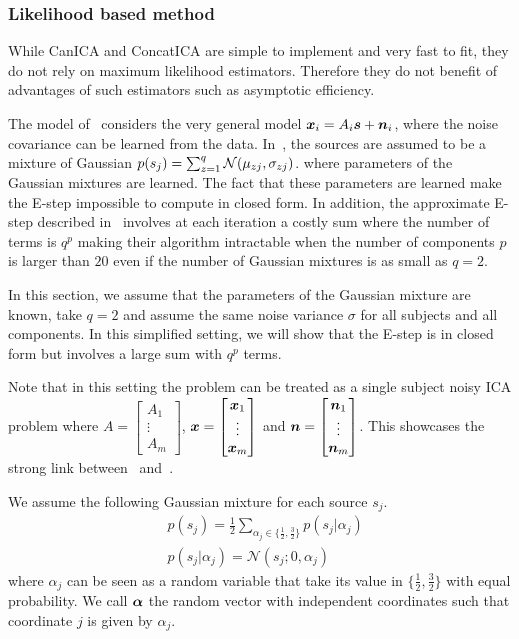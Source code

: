 \subsubsection{Likelihood based method}
\label{sec:guo}
While CanICA and ConcatICA are simple to implement and very fast to fit, they do
not rely on maximum likelihood estimators. Therefore they do not benefit of
advantages of such estimators such as asymptotic efficiency.

The model of~\cite{guo2008unified} considers the very general model $\boldsymbol{x}_i = A_i\boldsymbol{s} + \boldsymbol{n}_i$, where the noise covariance can be learned from the data. 
In~\cite{guo2008unified}, the sources are assumed to be a mixture of Gaussian
$p(s_j) = \sum_{z=1}^q \mathcal{N}(\mu_{zj}, \sigma_{zj})$.
where parameters of the Gaussian mixtures are learned. The fact that these
parameters are learned make the E-step impossible to compute in closed form. In
addition, the
approximate E-step described in~\cite{guo2008unified} involves at each iteration
a costly sum where the number of terms is $q^p$ making their algorithm
intractable when the number of components $p$ is larger than $20$ even if the
number of Gaussian mixtures is as small as $q=2$. 

In this section, we assume that the parameters of the Gaussian mixture are
known, take $q=2$ and assume the same noise variance $\sigma$ for all subjects and all
components. In this
simplified setting, we will show that the E-step is in closed form but involves
a large sum with $q^p$ terms.

Note that in this setting the problem can be treated as a single subject noisy
ICA problem where $A = \begin{bmatrix} A_1 \\ \vdots  \\ A_m \end{bmatrix}$,
$\boldsymbol{x} = \begin{bmatrix} \boldsymbol{x}_1 \\ \vdots  \\ \boldsymbol{x}_m \end{bmatrix}$ and $\boldsymbol{n}
= \begin{bmatrix} \boldsymbol{n}_1 \\ \vdots  \\ \boldsymbol{n}_m \end{bmatrix}$. This showcases the
strong link between~\cite{guo2008unified} and~\cite{moulines1997maximum}.

We assume the following Gaussian mixture for each source $s_j$.
\begin{align}
  &p(s_j) = \frac12 \sum_{\alpha_j \in \{\frac12, \frac32\}} p(s_j | \alpha_j) \\
  &p(s_j | \alpha_j) = \mathcal{N}( s_j; 0, \alpha_j)
\end{align}
where $\alpha_j$ can be seen as a random variable that take its value in $\{ \frac12,
\frac32 \}$  with equal probability. We call $\boldsymbol{\alpha}$ the random vector with
independent coordinates such that coordinate $j$ is given by $\alpha_j$.

